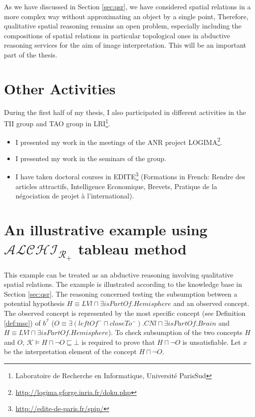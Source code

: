\documentclass{article}
\begin{document}
As we have discussed in Section \ref{sec:qsr}, we have considered spatial relations in a more complex way without approximating an object by a single point,
Therefore, qualitative spatial reasoning remains an open problem, especially including the compositions of spatial relations in particular topological ones
in abductive reasoning services for the aim of image interpretation. This will be an important part of the thesis.

\section{Other Activities}
During the first half of my thesis, I also participated in different activities in the TII group and TAO group 
in LRI\footnote{Laboratoire de Recherche en Informatique, Universit\'{e} ParisSud}.
\begin{itemize}
 \item I presented my work in the meetings of the ANR project LOGIMA\footnote{\url{http://logima.gforge.inria.fr/doku.php}}.
 \item I presented my work in the seminars of the group.
 \item I have taken doctoral courses in EDITE\footnote{\url{http://edite-de-paris.fr/spip/}}
 (Formations in French: Rendre des articles attractifs, Intelligence Economique, Brevets, Pratique de la négociation de projet à l'international).
\end{itemize}

\appendix
\section{An illustrative example using $\mathcal{ALCHI_{R_+}}$ tableau method}
\label{Appendix A}

This example can be treated as an abductive reasoning involving qualitative spatial relations.
The example is illustrated according to the knowledge base in Section \ref{sec:qsr}.
The reasoning concerned testing the subsumption between a potential hypothesis $H\equiv LVl\sqcap \exists isPartOf.Hemisphere$ and an observed concept.
The observed concept is represented by the most specific concept (see Definition \ref{def:msc}) of  $b^\mathcal{I}$
($O\equiv \exists (leftOf^-\sqcap closeTo^-). CNl\sqcap \exists isPartOf.Brain$ and $H\equiv LVl\sqcap \exists isPartOf.Hemisphere$).
To check subsumption of the two concepts $H$ and $O$, $\mathcal{K} \vDash H\sqcap \neg O \sqsubseteq \bot$ is required to prove that $H\sqcap \neg O$ is unsatisfiable.
Let $x$ be the interpretation element of the concept $H\sqcap \neg O$.
\end{document}
